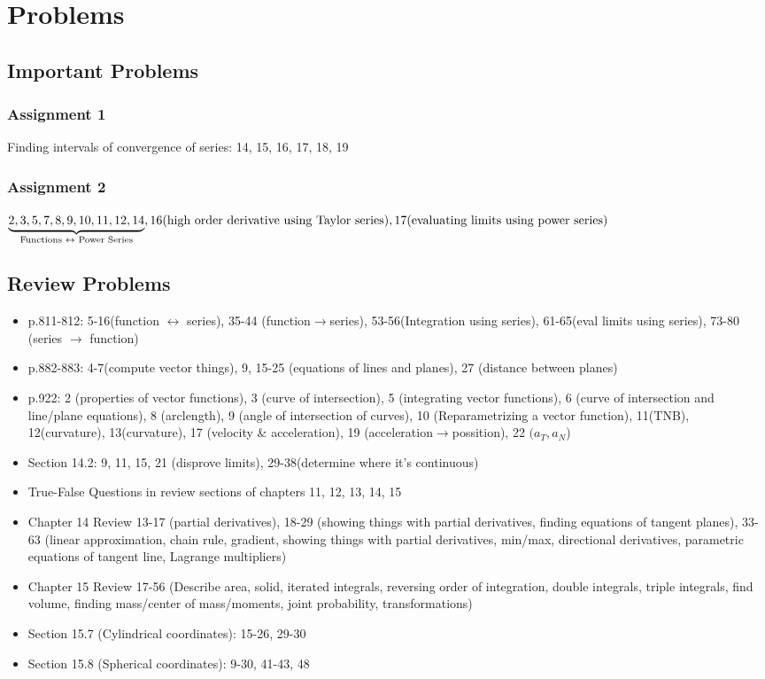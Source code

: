 \documentclass[12 pt]{article}
\theoremstyle{definition}
\begin{document}
\section{Problems}
\subsection{Important Problems}
\subsubsection{Assignment 1} Finding intervals of convergence of series: 14, 15, 16, 17, 18, 19
\subsubsection{Assignment 2} $\underbrace{2, 3, 5, 7, 8, 9, 10, 11, 12, 14}_{\text{Functions $\leftrightarrow$ Power Series}},
16(\text{high order derivative using Taylor series}),
\\17(\text{evaluating limits using power series})$
\subsection{Review Problems}
\begin{itemize}
	\item p.811-812: 5-16(function $\leftrightarrow$ series), 35-44 (function$\to$series), 53-56(Integration using series), 61-65(eval limits using series), 73-80 (series $\to$ function)
	\item p.882-883: 4-7(compute vector things), 9, 15-25 (equations of lines and planes), 27 (distance between planes)
	\item p.922: 2 (properties of vector functions), 3 (curve of intersection), 5 (integrating vector functions), 6 (curve of intersection and line/plane equations), 8 (arclength), 9 (angle of intersection of curves), 10 (Reparametrizing a vector function), 11(TNB), 12(curvature), 13(curvature), 17 (velocity \& acceleration), 19 (acceleration$\to$possition), 22 $(a_T,a_N$)
	\item Section 14.2: 9, 11, 15, 21 (disprove limits), 29-38(determine where it's continuous)
        \item True-False Questions in review sections of chapters 11, 12, 13, 14, 15
        \item Chapter 14 Review 13-17 (partial derivatives), 18-29 (showing things with partial derivatives, finding equations of tangent planes), 33-63 (linear approximation, chain rule, gradient, showing things with partial derivatives, min/max, directional derivatives, parametric equations of tangent line, Lagrange multipliers)
        \item Chapter 15 Review 17-56 (Describe area, solid, iterated integrals, reversing order of integration, double integrals, triple integrals, find volume, finding mass/center of mass/moments, joint probability, transformations)
        \item Section 15.7 (Cylindrical coordinates): 15-26, 29-30
        \item Section 15.8 (Spherical coordinates): 9-30, 41-43, 48
\end{itemize}
\end{document}
